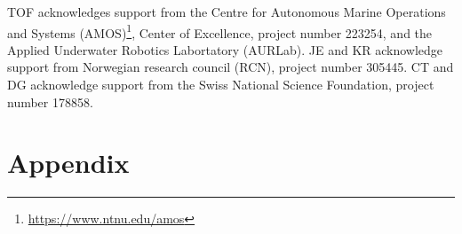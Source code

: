 \documentclass[aoas]{imsart}
\begin{document}
TOF acknowledges support from the Centre for Autonomous Marine
Operations and Systems
(AMOS)\footnote{\url{https://www.ntnu.edu/amos}}, Center of
Excellence, project number 223254, and the Applied Underwater Robotics
Labortatory (AURLab). JE and KR acknowledge support from Norwegian
research council (RCN), project number 305445. CT and DG acknowledge
support from the Swiss National Science Foundation, project number
178858.


\footnotesize




\section*{Appendix}






\end{document}
